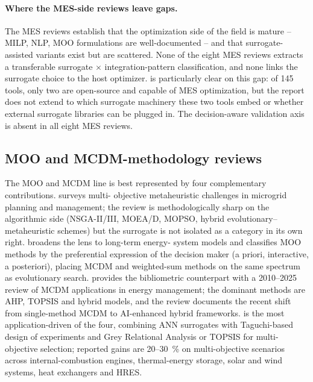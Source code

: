 \paragraph{Where the MES-side reviews leave gaps.}
The MES reviews establish that the optimization side of the field is
mature -- MILP, NLP, MOO formulations are well-documented -- and
that surrogate-assisted variants exist but are scattered. None of
the eight MES reviews extracts a transferable surrogate $\times$
integration-pattern classification, and none links the surrogate
choice to the host optimizer. \cite{Klemm2021} is particularly clear
on this gap: of 145 tools, only two are open-source and capable of
MES optimization, but the report does not extend to which surrogate
machinery these two tools embed or whether external surrogate
libraries can be plugged in. The decision-aware validation axis is
absent in all eight MES reviews.

\subsection{MOO and MCDM-methodology reviews}
\label{sec:related-moo-mcdm}

The MOO and MCDM line is best represented by four complementary
contributions. \cite{salgueiro_multi-objective_2019} surveys multi-
objective metaheuristic challenges in microgrid planning and
management; the review is methodologically sharp on the algorithmic
side (NSGA-II/III, MOEA/D, MOPSO, hybrid evolutionary--metaheuristic
schemes) but the surrogate is not isolated as a category in its own
right. \cite{ChenRenZhou2023} broadens the lens to long-term energy-
system models and classifies MOO methods by the preferential
expression of the decision maker (a priori, interactive, a
posteriori), placing MCDM and weighted-sum methods on the same
spectrum as evolutionary search. \cite{Sahoo2025} provides the
bibliometric counterpart with a 2010--2025 review of MCDM
applications in energy management; the dominant methods are AHP,
TOPSIS and hybrid models, and the review documents the recent shift
from single-method MCDM to AI-enhanced hybrid frameworks.
\cite{Etghani2025} is the most application-driven of the four,
combining ANN surrogates with Taguchi-based design of experiments
and Grey Relational Analysis or TOPSIS for multi-objective
selection; reported gains are 20--30~\% on multi-objective scenarios
across internal-combustion engines, thermal-energy storage, solar
and wind systems, heat exchangers and HRES.

